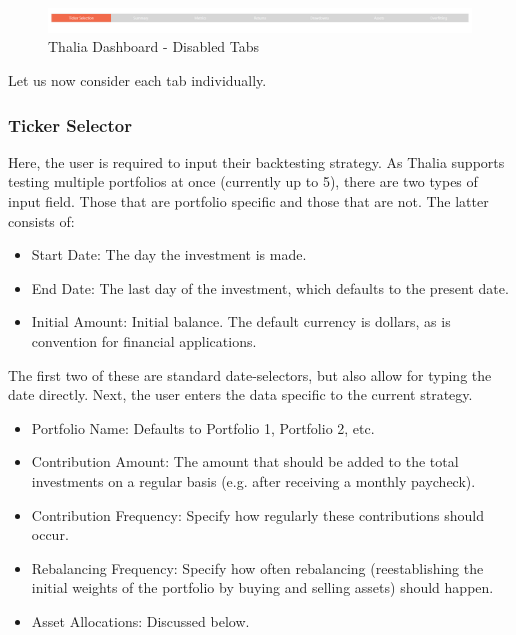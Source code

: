 \documentclass[main.tex]{subfiles}
\begin{document}
\begin{figure}[H]
   \centering
   \includegraphics[width=\textwidth]{08Appendices/081User/081Pictures/disabled_tabs.png}
   \caption{Thalia Dashboard - Disabled Tabs}
   \label{thalia_disabled_tabs}
\end{figure}

Let us now consider each tab individually. 

\subsubsection{Ticker Selector}

\label{create_portfolio}

Here, the user is required to input their backtesting strategy. As Thalia supports testing multiple portfolios at once (currently up to 5), there are two types of input field. Those that are portfolio specific and those that are not. The latter consists of:

\begin{itemize}
    \item Start Date: The day the investment is made.
    \item End Date: The last day of the investment, which defaults to the present date.
    \item Initial Amount: Initial balance. The default currency is dollars, as is convention for financial applications.
\end{itemize}

The first two of these are standard date-selectors, but also allow for typing the date directly. Next, the user enters the data specific to the current strategy.

\begin{itemize}
    \item Portfolio Name: Defaults to Portfolio 1, Portfolio 2, etc. 
    \item Contribution Amount: The amount that should be added to the total investments on a regular basis (e.g. after receiving a monthly paycheck).
    \item Contribution Frequency: Specify how regularly these contributions should occur.
    \item Rebalancing Frequency: Specify how often rebalancing (reestablishing the initial weights of the portfolio by buying and selling assets) should happen. 
    \item Asset Allocations: Discussed below.
\end{itemize}
\end{document}
